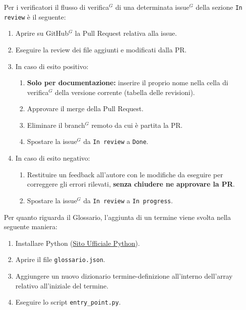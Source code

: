\documentclass[a4paper,10pt]{article}
\begin{document}
Per i verificatori il flusso di verifica$^G$ di una determinata issue$^G$ della sezione \texttt{In review} è il seguente:
\begin{enumerate}
  \item Aprire su GitHub$^G$ la Pull Request relativa alla issue.
  \item Eseguire la review dei file aggiunti e modificati dalla PR.
  \item[-] In caso di esito positivo:
    \begin{enumerate}[start=3, label=\arabic*.]
      \item \textbf{Solo per documentazione:} inserire il proprio nome nella cella di verifica$^G$ della versione corrente (tabella delle revisioni). 
      \item Approvare il merge della Pull Request.
      \item Eliminare il branch$^G$ remoto da cui è partita la PR.
      \item Spostare la issue$^G$ da \texttt{In review} a \texttt{Done}.
    \end{enumerate}
  \item[-] In caso di esito negativo:
    \begin{enumerate}[start=3, label=\arabic*.]
      \item Restituire un feedback all'autore con le modifiche da eseguire per correggere gli errori rilevati, \textbf{senza chiudere ne approvare la PR}.
      \item Spostare la issue$^G$ da \texttt{In review} a \texttt{In progress}.
    \end{enumerate}
\end{enumerate}

Per quanto riguarda il Glossario, l'aggiunta di un termine viene svolta nella seguente maniera:
\begin{enumerate}
  \item[0.] Installare Python (\href{https://python.org}{\underline{Sito Ufficiale Python}}).
  \item Aprire il file \texttt{glossario.json}.
  \item Aggiungere un nuovo dizionario termine-definizione all'interno dell'array relativo all'iniziale del termine.
  \item Eseguire lo script \texttt{entry\_point.py}.
\end{enumerate}
\end{document}

